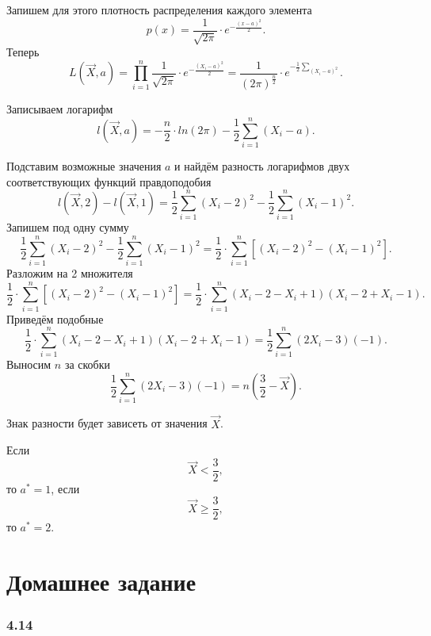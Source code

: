 Запишем для этого плотность распределения каждого элемента
$$p \left( x \right) =
  \frac{1}{ \sqrt{2 \pi }} \cdot e^{- \frac{ \left( x - a \right)^2}{2}}.$$
Теперь
$$L \left( \vec{X}, a \right) =
  \prod \limits_{i = 1}^n \frac{1}{ \sqrt{2 \pi }} \cdot e^{- \frac{ \left( X_i - a \right)^2}{2}} =
  \frac{1}{ \left( 2 \pi \right)^{ \frac{n}{2}}} \cdot
  e^{- \frac{1}{2} \sum \limits_{ \left( X_i - a \right)^2}}.$$

Записываем логарифм
$$l \left( \vec{X}, a \right) =
  - \frac{n}{2} \cdot ln \left( 2 \pi \right) -
  \frac{1}{2} \sum \limits_{i = 1}^n \left( X_i - a \right).$$

Подставим возможные значения $a$ и найдём разность логарифмов двух
соответствующих функций правдоподобия
$$l \left( \vec{X}, 2 \right) - l \left( \vec{X}, 1 \right) =
  \frac{1}{2} \sum \limits_{i = 1}^n \left( X_i - 2 \right)^2 -
  \frac{1}{2} \sum \limits_{i = 1}^n \left( X_i - 1 \right)^2.$$
Запишем под одну сумму
$$ \frac{1}{2} \sum \limits_{i = 1}^n \left( X_i - 2 \right)^2 -
  \frac{1}{2} \sum \limits_{i = 1}^n \left( X_i - 1 \right)^2 =
  \frac{1}{2} \cdot
  \sum \limits_{i = 1}^n \left[ \left( X_i - 2 \right)^2 - \left( X_i - 1 \right)^2 \right].$$
Разложим на 2 множителя
$$ \frac{1}{2} \cdot
  \sum \limits_{i = 1}^n \left[ \left( X_i - 2 \right)^2 - \left( X_i - 1 \right)^2 \right] =
  \frac{1}{2} \cdot
  \sum \limits_{i = 1}^n \left( X_i - 2 - X_i + 1 \right) \left( X_i - 2 + X_i - 1 \right).$$
Приведём подобные
$$ \frac{1}{2} \cdot
  \sum \limits_{i = 1}^n \left( X_i - 2 - X_i + 1 \right) \left( X_i - 2 + X_i - 1 \right) =
  \frac{1}{2} \sum \limits_{i = 1}^n \left( 2X_i - 3 \right) \left( -1 \right).$$
Выносим $n$ за скобки
$$ \frac{1}{2} \sum \limits_{i = 1}^n \left( 2X_i - 3 \right) \left( -1 \right) =
  n \left( \frac{3}{2} - \vec{X} \right).$$

Знак разности будет зависеть от значения $ \vec{X}$.

Если
$$ \vec{X} <
  \frac{3}{2},$$
то $a^* = 1$, если
$$ \vec{X} \geq
  \frac{3}{2},$$
то $a^* = 2$.

\section*{Домашнее задание}

\subsubsection*{4.14}

